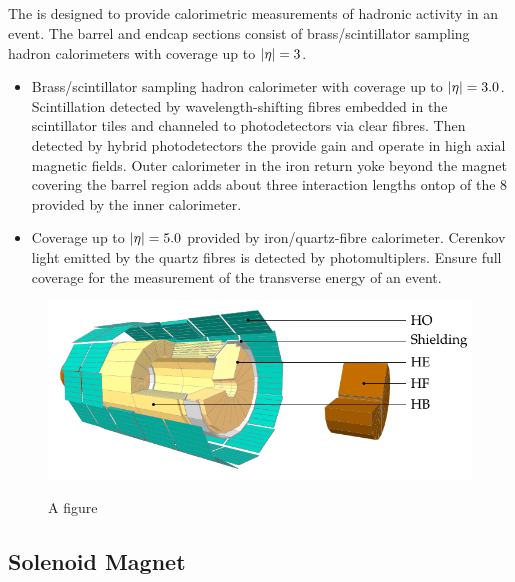 \subsection{\HCAL}

The \HCAL is designed to provide calorimetric measurements of hadronic activity
in an event. The barrel and endcap sections consist of brass/scintillator
sampling hadron calorimeters with coverage up to ${|\eta|=3}$.

\begin{itemize}
    \item Brass/scintillator sampling hadron calorimeter with coverage up to
        ${|\eta|=3.0}$. Scintillation detected by wavelength-shifting fibres
        embedded in the scintillator tiles and channeled to photodetectors
        via clear fibres. Then detected by hybrid photodetectors the provide
        gain and operate in high axial magnetic fields. Outer calorimeter
        in the iron return yoke beyond the magnet covering the barrel region
        adds about three interaction lengths ontop of the 8 provided by the
        inner calorimeter.
    \item Coverage up to ${|\eta|=5.0}$ provided by iron/quartz-fibre
        calorimeter. Cerenkov light emitted by the quartz fibres is detected by
        photomultiplers. Ensure full coverage for the measurement of the
        transverse energy of an event.
\end{itemize}

\begin{figure}[htbp]
    \centering
    \includegraphics{diagrams/tikz/cms/annotated/cms_hcal.pdf}
    \label{fig:cms-hcal}
    \caption{
        A figure 
    }
\end{figure}

\subsection{Solenoid Magnet}

